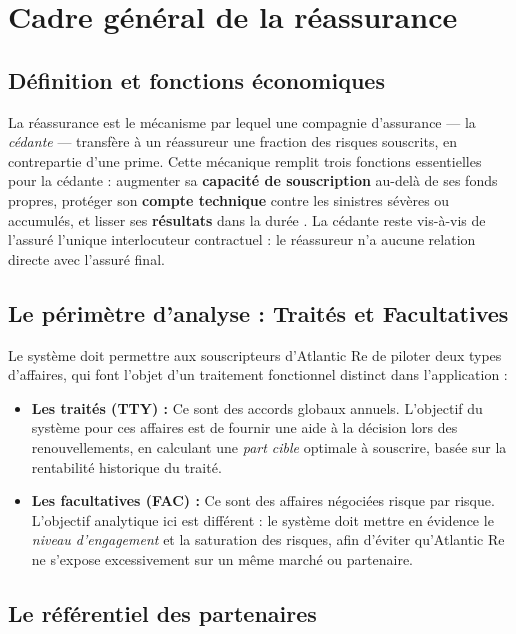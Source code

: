 \documentclass[12pt,a4paper]{report}
\begin{document}
\section{Cadre général de la réassurance}

\subsection{Définition et fonctions économiques}

La réassurance est le mécanisme par lequel une compagnie d'assurance --- la
\textit{cédante} --- transfère à un réassureur une fraction des risques souscrits,
en contrepartie d'une prime. Cette mécanique remplit trois fonctions essentielles
pour la cédante : augmenter sa \textbf{capacité de souscription} au-delà de ses
fonds propres, protéger son \textbf{compte technique} contre les sinistres sévères
ou accumulés, et lisser ses \textbf{résultats} dans la durée \citep{Outreville2013}.
La cédante reste vis-à-vis de l'assuré l'unique interlocuteur contractuel : le
réassureur n'a aucune relation directe avec l'assuré final.

\subsection{Le périmètre d'analyse : Traités et Facultatives}

Le système doit permettre aux souscripteurs d'Atlantic Re de piloter deux types d'affaires, qui font l'objet d'un traitement fonctionnel distinct dans l'application :
\begin{itemize}[leftmargin=1.5cm, itemsep=2pt]
  \item \textbf{Les traités (TTY) :} Ce sont des accords globaux annuels. L'objectif du système pour ces affaires est de fournir une aide à la décision lors des renouvellements, en calculant une \textit{part cible} optimale à souscrire, basée sur la rentabilité historique du traité.
  \item \textbf{Les facultatives (FAC) :} Ce sont des affaires négociées risque par risque. L'objectif analytique ici est différent : le système doit mettre en évidence le \textit{niveau d'engagement} et la saturation des risques, afin d'éviter qu'Atlantic Re ne s'expose excessivement sur un même marché ou partenaire.
\end{itemize}

\subsection{Le référentiel des partenaires}
\end{document}
